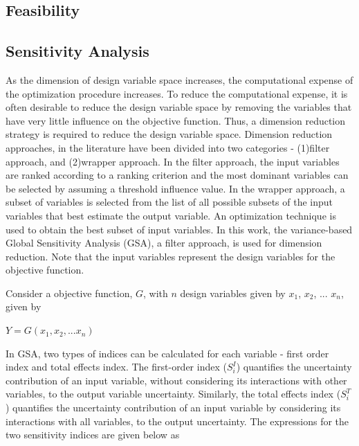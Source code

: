 \documentclass[10pt]{article}
\begin{document}
\subsection{Feasibility}
\label{sec:Feasibility}

\subsection{Sensitivity Analysis}
\label{sec:Sensitivity}
\hspace{5 mm} As the dimension of design variable space increases, the computational expense of the optimization procedure increases. To reduce the computational expense, it is often desirable to reduce the design variable space by removing the variables that have very little influence on the objective function. Thus, a dimension reduction strategy is required to reduce the design variable space. Dimension reduction approaches, in the literature have been divided into two categories - (1)filter approach, and (2)wrapper approach. In the filter approach, the input variables are ranked according to a ranking criterion and the most dominant variables can be selected by assuming a threshold influence value. In the wrapper approach, a subset of variables is selected from the list of all possible subsets of the input variables that best estimate the output variable. An optimization technique is used to obtain the best subset of input variables. In this work, the variance-based Global Sensitivity Analysis (GSA), a filter approach, is used for dimension reduction. Note that the input variables represent the design variables for the objective function. 

\hspace{5 mm} Consider a objective function, $G$, with $n$ design variables given by $x_{1}$, $x_{2}$, ...  $x_{n}$, given by

\centerline{$Y = G(x_{1}, x_{2}, ... x_{n})$}

In GSA, two types of indices can be calculated for each variable - first order index and total effects index. The first-order index ($S_{i}^{I}$) quantifies the uncertainty contribution of an input variable, without considering its interactions with other variables, to the output variable uncertainty. Similarly, the total effects index ($S_{i}^{T}$) quantifies the uncertainty contribution of an input variable by considering its interactions with all variables, to the output uncertainty. The expressions for the two sensitivity indices are given below as 
\end{document}
